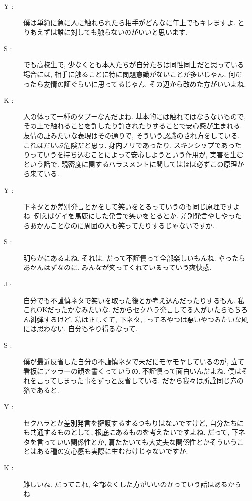 \documentclass[10pt,b5jsbook,dvips,dvipdfmx,openany]{jsbook}
\theoremstyle{definition}
\begin{document}
\begin{description}
		\item[ Y : ] 僕は単純に急に人に触れられたら相手がどんなに年上でもキレますよ. とりあえずは誰に対しても触らないのがいいと思います.

		\item[ S : ] でも高校生で, 少なくとも本人たちが自分たちは同性同士だと思っている場合には, 相手に触ることに特に問題意識がないことが多いじゃん.  何だったら友情の証ぐらいに思ってるじゃん.  その辺から改めた方がいいよね.

		\item[ K : ] 人の体って一種のタブーなんだよね. 基本的には触れてはならないもので, その上で触れることを許したり許されたりすることで安心感が生まれる. 友情の証みたいな表現はその通りで, そういう認識のされ方をしている. これはだいぶ危険だと思う. 身内ノリであったり, スキンシップであったりっていうを持ち込むことによって安心しようという作用が, 実害を生むという話で. 親密度に関するハラスメントに関してはほぼ必ずこの原理から来ている.

		\item[ Y : ] 下ネタとか差別発言とかをして笑いをとるっていうのも同じ原理ですよね. 例えばゲイを馬鹿にした発言で笑いをとるとか. 差別発言やしやったらあかんことなのに周囲の人も笑ってたりするじゃないですか.

		\item[ S : ] 明らかにあるよね, それは. だって不謹慎って全部楽しいもんね. やったらあかんはずなのに, みんなが笑ってくれているっていう爽快感.

		\item[ J : ] 自分でも不謹慎ネタで笑いを取った後とか考え込んだったりするもん. 私これOKだったかなみたいな. だからセクハラ発言してる人がいたらもちろん糾弾するけど, 私は正しくて, 下ネタ言ってるやつは悪いやつみたいな風には思わない. 自分もやり得るなって.

		\item[ S : ] 僕が最近反省した自分の不謹慎ネタで未だにモヤモヤしているのが, 立て看板にアッラーの顔を書くっていうの. 不謹慎って面白いんだよね. 僕はそれを言ってしまった事をずっと反省している. だから我々は所詮同じ穴の狢であると.

		\item[ Y : ] セクハラとか差別発言を擁護するするつもりはないですけど, 自分たちにも共通するものとして, 根底にあるものを考えたいですよね. だって, 下ネタを言っていい関係性とか, 肩たたいても大丈夫な関係性とかそういうことはある種の安心感も実際に生むわけじゃないですか.

		\item[ K : ] 難しいね. だってこれ, 全部なくした方がいいのかっていう話はあるからね.


\end{description}
\end{document}
